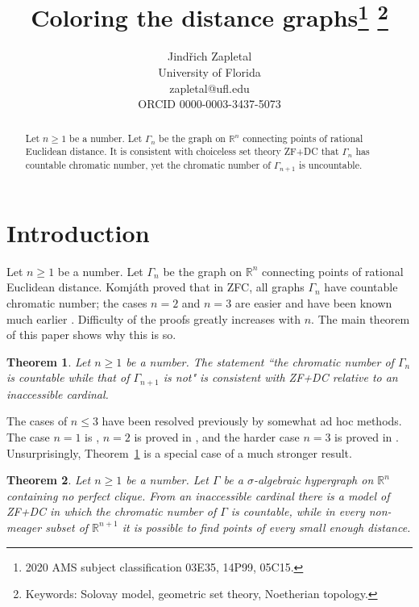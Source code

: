 \documentclass{article}
\title{Coloring the distance graphs\footnote{2020 AMS subject classification 03E35, 14P99, 05C15.} \footnote{Keywords: Solovay model, geometric set theory, Noetherian topology.}}
\author{
Jind{\v r}ich Zapletal\\
University of Florida\\
zapletal@ufl.edu\\
ORCID 0000-0003-3437-5073}
\newcommand{\gs}{\sigma}
\newtheorem{theorem}{Theorem}[section]
\theoremstyle{definition}
\begin{document}
\maketitle

\begin{abstract}
Let $n\geq 1$ be a number. Let $\Gamma_n$ be the graph on $\mathbb{R}^n$ connecting points of rational Euclidean distance. It is consistent with choiceless set theory ZF+DC that $\Gamma_n$ has countable chromatic number, yet the chromatic number of $\Gamma_{n+1}$ is uncountable.
\end{abstract}

\section{Introduction}

Let $n\geq 1$ be a number. Let $\Gamma_n$ be the graph on $\mathbb{R}^n$ connecting points of rational Euclidean distance. Komj{\' a}th \cite{komjath:decomposition} proved  that in ZFC, all graphs $\Gamma_n$ have countable chromatic number; the cases $n=2$ and $n=3$ are easier and have been known much earlier \cite{komjath:r3} \cite{hajnal:chromatic}. Difficulty of the proofs greatly increases with $n$.  The main theorem of this paper shows why this is so.

\begin{theorem}
\label{maintheorem}
Let $n\geq 1$ be a number. The statement ``the chromatic number of $\Gamma_n$ is countable while that of $\Gamma_{n+1}$ is not"  is consistent with ZF+DC relative to an inaccessible cardinal.
\end{theorem}

\noindent The cases of $n\leq 3$ have been resolved previously by somewhat ad hoc methods. The case $n=1$ is \cite[Corollary 12.3.16]{z:geometric}, $n=2$ is proved in \cite[Corollary 12.3.18]{z:geometric}, and the harder case $n=3$ is proved in \cite{z:distance3}. Unsurprisingly, Theorem~\ref{maintheorem} is a special case of a much stronger result. 

\begin{theorem}
\label{maintheorem2}
Let $n\geq 1$ be a number. Let $\Gamma$ be a $\gs$-algebraic hypergraph on $\mathbb{R}^n$ containing no perfect clique. From an inaccessible cardinal there is a model of ZF+DC in which the chromatic number of $\Gamma$ is countable, while in every non-meager subset of $\mathbb{R}^{n+1}$ it is possible to find points of every small enough distance.
\end{theorem}
\end{document}

